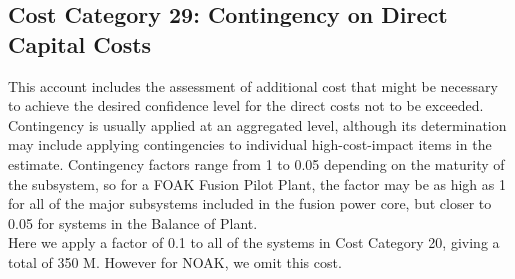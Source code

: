 \subsection{Cost Category 29: Contingency on Direct Capital Costs}

This account includes the assessment of additional cost that might be necessary to achieve the desired confidence level for the direct costs not to be exceeded. Contingency is usually applied at an aggregated level, although its determination may include applying contingencies to individual high-cost-impact items in the estimate.  Contingency factors range from 1 to 0.05 depending on the maturity of the subsystem, so for a FOAK Fusion Pilot Plant, the factor may be as high as 1 for all of the major subsystems included in the fusion power core, but closer to 0.05 for systems in the Balance of Plant.  \\

Here we apply a factor of 0.1 to all of the systems in Cost Category 20, giving a total of  350 M. {\color{blue} However for NOAK, we omit this cost.}


